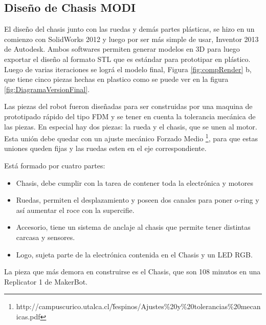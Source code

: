 \subsection{Diseño de Chasis MODI}
El diseño del chasis junto con las ruedas y demás partes plásticas, se hizo en un comienzo con SolidWorks 2012 y luego por ser más simple de usar, Inventor 2013 de Autodesk. Ambos softwares permiten generar modelos en 3D para luego exportar el diseño al formato STL que es estándar para prototipar en plástico. Luego de varias iteraciones se lográ el modelo final, Figura \ref{fig:compRender} b, que tiene cinco piezas hechas en plastico como se puede ver en la figura \ref{fig:DiagramaVersionFinal}. 

Las piezas del robot fueron diseñadas para ser construidas por una maquina de prototipado rápido del tipo FDM y se tener en cuenta la tolerancia mecánica de las piezas. En especial hay dos piezas: la rueda y el chasis, que se unen al motor. Esta unión debe quedar con un ajuste mecánico Forzado Medio \footnote{http://campuscurico.utalca.cl/\~ fespinos/Ajustes\%20y\%20tolerancias\%20mecanicas.pdf}, para que estas uniones queden fijas y las ruedas esten en el eje correspondiente.

Está formado por cuatro partes:


\begin{itemize}
\item Chasis, debe cumplir con la tarea de contener toda la electrónica y motores
\item Ruedas, permiten el desplazamiento y poseen dos canales para poner o-ring y así aumentar el roce con la supercifie.
\item Accesorio, tiene un sistema de anclaje al chasis que permite tener distintas carcasa y sensores.
\item Logo,  sujeta parte de la electrónica contenida en el Chasis y un LED RGB.
\end{itemize}

La pieza que más demora en construirse es el Chasis, que son 108 minutos en una Replicator 1 de MakerBot.

